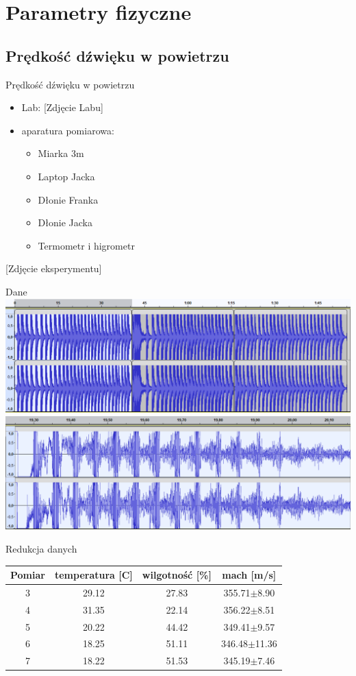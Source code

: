 \documentclass{beamer}
\begin{document}
\section{Parametry fizyczne}

\subsection{Prędkość dźwięku w powietrzu}

\begin{frame}{Prędkość dźwięku w powietrzu}
\begin{itemize}
\item Lab: [Zdjęcie Labu]
\item aparatura pomiarowa:
	\begin{itemize}
		\item Miarka $3$m
		\item Laptop Jacka
		\item Dłonie Franka
		\item Dłonie Jacka
		\item Termometr i higrometr
	\end{itemize}
\end{itemize}
[Zdjęcie eksperymentu]
\end{frame}

\begin{frame}{Dane}
\includegraphics[width=\linewidth]{Data.png}
\includegraphics[width=\linewidth]{Data_zoom.png}

\end{frame}

\begin{frame}{Redukcja danych}
\centering
\begin{tabular}{cccc}
\toprule
Pomiar & temperatura [C] & wilgotność [\%]  & mach [m/s]\\
\midrule
3 & 29.12 & 27.83 & 355.71$\pm$8.90 \\
4 & 31.35 & 22.14 & 356.22$\pm$8.51 \\
5 & 20.22 & 44.42 & 349.41$\pm$9.57 \\
6 & 18.25 & 51.11 & 346.48$\pm$11.36 \\
7 & 18.22 & 51.53 & 345.19$\pm$7.46 \\
\bottomrule
\end{tabular}


\end{frame}
\end{document}
